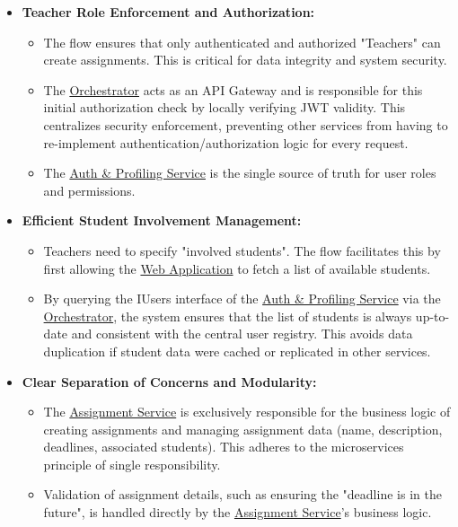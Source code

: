 \begin{itemize}
    \item \textbf{Teacher Role Enforcement and Authorization:}
    \begin{itemize}
        \item The flow ensures that only authenticated and authorized "Teachers" can create assignments. This is critical for data integrity and system security.
        \item The \hyperref[def:Orchestrator]{Orchestrator} acts as an API Gateway and is responsible for this initial authorization check by locally verifying JWT validity. This centralizes security enforcement, preventing other services from having to re-implement authentication/authorization logic for every request.
        \item The \hyperref[def:AuthProfilingService]{Auth \& Profiling Service} is the single source of truth for user roles and permissions.
    \end{itemize}
    \item \textbf{Efficient Student Involvement Management:}
    \begin{itemize}
        \item Teachers need to specify "involved students". The flow facilitates this by first allowing the \hyperref[def:WebApplication]{Web Application} to fetch a list of available students.
        \item By querying the IUsers interface of the \hyperref[def:AuthProfilingService]{Auth \& Profiling Service} via the \hyperref[def:Orchestrator]{Orchestrator}, the system ensures that the list of students is always up-to-date and consistent with the central user registry. This avoids data duplication if student data were cached or replicated in other services.
    \end{itemize}
    \item \textbf{Clear Separation of Concerns and Modularity:}
    \begin{itemize}
        \item The \hyperref[def:AssignmentService]{Assignment Service} is exclusively responsible for the business logic of creating assignments and managing assignment data (name, description, deadlines, associated students). This adheres to the microservices principle of single responsibility.
        \item Validation of assignment details, such as ensuring the "deadline is in the future", is handled directly by the \hyperref[def:AssignmentService]{Assignment Service}'s business logic.

\end{itemize}
\end{itemize}

